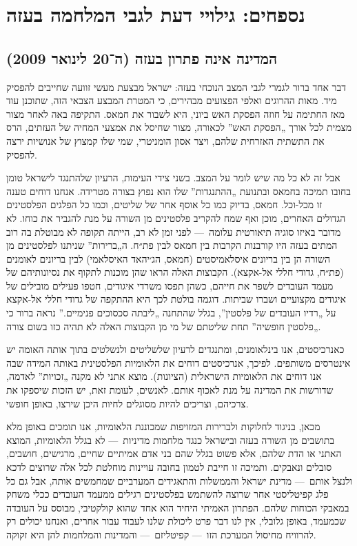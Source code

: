 \section*{נספחים: גילויי דעת לגבי המלחמה בעזה}

\subsection*{המדינה אינה פתרון בעזה (ה־20 לינואר 2009)}

דבר אחד ברור לגמרי לגבי המצב הנוכחי בעזה: ישראל מבצעת מעשי זוועה שחייבים להפסיק מיד. מאות ההרוגים ואלפי הפצועים מבהירים, כי המטרת המבצע הצבאי הזה, שתוכנן עוד מאז החתימה על חוזה הפסקת האש ביוני, היא לשבור את חמאס. התקיפה באה לאחר מצור מצמית לכל אורך „הפסקת האש” לכאורה, מצור שחיסל את אמצעי המחיה של העזתים, הרס את התשתית האזרחית שלהם, ויצר אסון הומניטרי, שמי שלו קמצוץ של אנושיות ירצה להפסיק.

אבל זה לא כל מה שיש לומר על המצב. בשני צידי העימות, הרעיון שלהתנגד לישראל טומן בחובו תמיכה בחמאס ובתנועת „ההתנגדות” שלו הוא נפוץ בצורה מטרידה. אנחנו דוחים טענה זו מכל-וכל. חמאס, בדיוק כמו כל אוסף אחר של שליטים, וכמו כל הפלגים הפלסטינים הגדולים האחרים, מוכן ואף שמח להקריב פלסטינים מן השורה על מנת להגביר את כוחו. לא מדובר באיזו סוגיה תיאורטית עלומה~— לפני זמן לא רב, הייתה תקופה לא מבוטלת בה רוב המתים בעזה היו קורבנות הקרבות בין חמאס לבין פת״ח. ה„ברירות” שניתנו לפלסטינים מן השורה הן בין בריונים איסלאמיסטים (חמאס, הג׳יהאד האיסלאמי) לבין בריונים לאומנים (פת״ח, גדודי חללי אל-אקצא). הקבוצות האלה הראו שהן מוכנות לתקוף את נסיונותיהם של מעמד העובדים לשפר את חייהם, כשהן תפסו משרדי איגודים, חטפו פעילים מובילים של איגודים מקצועיים ושברו שביתות. דוגמה בולטת לכך היא ההתקפה של גדודי חללי אל-אקצא על „רדיו העובדים של פלסטין”, בגלל שהתחנה „ליבתה סכסוכים פנימיים.” נראה ברור כי „פלסטין חופשיה” תחת שליטתם של מי מן הקבוצות האלה לא תהיה כזו בשום צורה.

כאנרכיסטים, אנו בינלאומנים, ומתנגדים לרעיון שלשליטים ולנשלטים בתוך אותה האומה יש אינטרסים משותפים. לפיכך, אנרכיסטים דוחים את הלאומיות הפלסטינית באותה המידה שבה אנו דוחים את הלאומיות הישראלית (הציונות). מוצא אתני לא מקנה „זכויות” לאדמה, שדורשות את המדינה על מנת לאכוף אותם. לאנשים, לעומת זאת, יש הזכות שיספקו את צרכיהם, וצריכים להיות מסוגלים לחיות היכן שירצו, באופן חופשי.

מכאן, בניגוד לחלוקות ולברירות המזויפות שמכוננת הלאומיות, אנו תומכים באופן מלא בתושבים מן השורה בעזה ובישראל כנגד מלחמות מדיניות~— לא בגלל הלאומיות, המוצא האתני או הדת שלהם, אלא פשוט בגלל שהם בני אדם אמיתיים שחיים, מרגישים, חושבים, סובלים ונאבקים. ותמיכה זו חייבת לטמון בחובה עויינות מוחלטת לכל אלה שרוצים לדכא ולנצל אותם~— מדינת ישראל והממשלות והתאגידים המערביים שמחמשים אותה, אבל גם כל פלג קפיטליסטי אחר שרוצה להשתמש בפלסטינים רגילים ממעמד העובדים ככלי משחק במאבקי הכוחות שלהם. הפתרון האמיתי היחיד הוא אחד שהוא קולקטיבי, מבוסס על העובדה שכמעמד, באופן גלובלי, אין לנו דבר פרט ליכולת שלנו לעבוד עבור אחרים, ואנחנו יכולים רק להרוויח מחיסול המערכת הזו~— קפיטליזם~— והמדינות והמלחמות להן היא זקוקה.


